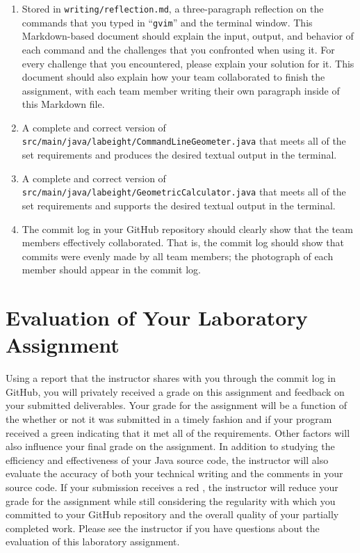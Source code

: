 \documentclass[11pt]{article}
\newcommand{\mainprogramsource}{\lstinline{src/main/java/labeight/CommandLineGeometer.java}}
\newcommand{\secondprogramsource}{\lstinline{src/main/java/labeight/GeometricCalculator.java}}
\newcommand{\reflection}{\lstinline{writing/reflection.md}}
\newcommand{\command}[1]{``\lstinline{#1}''}
\newcommand{\checkmark}{\ding{51}}
\newcommand{\naughtmark}{\ding{55}}
\begin{document}
\begin{enumerate}

  \setlength{\itemsep}{0in}

\item Stored in \reflection{}, a three-paragraph reflection on the commands that you typed in \command{gvim} and the
  terminal window. This Markdown-based document should explain the input, output, and behavior of each command and the
  challenges that you confronted when using it. For every challenge that you encountered, please explain your solution
  for it. This document should also explain how your team collaborated to finish the assignment, with each team member
  writing their own paragraph inside of this Markdown file.

\item A complete and correct version of \mainprogramsource{} that meets all of the set requirements and produces the
  desired textual output in the terminal.

\item A complete and correct version of \secondprogramsource{} that meets all of the set requirements and supports the
  desired textual output in the terminal.

\item The commit log in your GitHub repository should clearly show that the team members effectively collaborated. That
  is, the commit log should show that commits were evenly made by all team members; the photograph of each member should
  appear in the commit log.

\end{enumerate}

\section*{Evaluation of Your Laboratory Assignment}

Using a report that the instructor shares with you through the commit log in GitHub, you will privately received a grade
on this assignment and feedback on your submitted deliverables. Your grade for the assignment will be a function of the
whether or not it was submitted in a timely fashion and if your program received a green \checkmark{} indicating that it
met all of the requirements. Other factors will also influence your final grade on the assignment. In addition to
studying the efficiency and effectiveness of your Java source code, the instructor will also evaluate the accuracy of
both your technical writing and the comments in your source code. If your submission receives a red \naughtmark{}, the
instructor will reduce your grade for the assignment while still considering the regularity with which you committed to
your GitHub repository and the overall quality of your partially completed work. Please see the instructor if you have
questions about the evaluation of this laboratory assignment.
\end{document}
